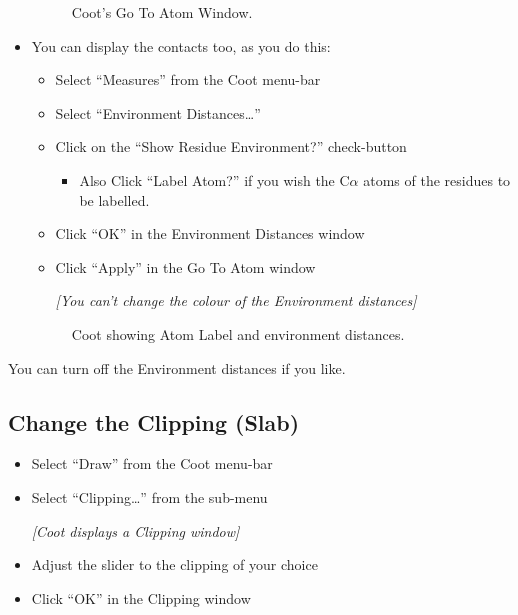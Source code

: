 \documentclass{article}
\begin{document}
\begin{itemize}
\begin{figure}[htbp]
  \begin{center}
    \leavevmode
    \epsfxsize 70mm
    \caption{Coot's Go To Atom Window.}
    \label{fig:goto-atom}
  \end{center}
\end{figure}

\item You can display the contacts too, as you do this:

  \begin{itemize}
  \item Select \textsf{``Measures''} from the Coot menu-bar
  \item Select \textsf{``Environment Distances\ldots''}
  \item Click on the \textsf{``Show Residue Environment?''} check-button
    \begin{itemize}
    \item Also Click \textsf{``Label Atom?''} if you wish the
      C$\alpha$ atoms of the residues to be labelled.
    \end{itemize}
  \item Click \textsf{``OK''} in the Environment Distances window
  \item Click \textsf{``Apply''} in the Go To Atom window

    \emph{[You can't change the colour of the Environment distances]}
  \end{itemize}

  \begin{figure}[htbp]
    \begin{center}
      \leavevmode
      \epsfxsize 70mm
      \caption{Coot showing Atom Label and environment distances.}
      \label{fig:environment}
    \end{center}
  \end{figure}
\end{itemize}

You can turn off the Environment distances if you like.

\subsection{Change the Clipping (Slab)}

\begin{itemize}
\item Select \textsf{``Draw''} from the Coot menu-bar
\item Select \textsf{``Clipping\ldots''} from the sub-menu

\textsl{ [Coot displays a Clipping window]}

\item Adjust the slider to the clipping of your choice
\item Click \textsf{``OK''} in the Clipping window
\end{itemize}
\end{document}
